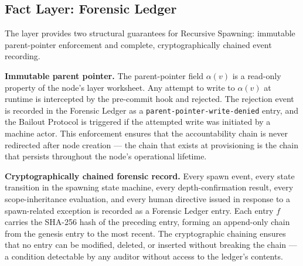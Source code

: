 \subsection{Fact Layer: Forensic Ledger}
\label{sec:rs-fact-fledger}

The \Fact{} layer provides two structural guarantees for Recursive Spawning:
immutable parent-pointer enforcement and complete, cryptographically chained
event recording.

\medskip
\noindent\textbf{Immutable parent pointer.}  The parent-pointer field
$\alpha(v)$ is a read-only property of the node's \Fact{} layer worksheet.
Any attempt to write to $\alpha(v)$ at runtime is intercepted by the pre-commit
hook and rejected.  The rejection event is recorded in the Forensic Ledger as
a \texttt{parent-pointer-write-denied} entry, and the Bailout Protocol is
triggered if the attempted write was initiated by a machine actor.  This
enforcement ensures that the accountability chain is never redirected after node
creation — the chain that exists at provisioning is the chain that persists
throughout the node's operational lifetime.

\medskip
\noindent\textbf{Cryptographically chained forensic record.}  Every spawn event,
every state transition in the spawning state machine, every depth-confirmation
result, every scope-inheritance evaluation, and every human directive issued in
response to a spawn-related exception is recorded as a Forensic Ledger entry.
Each entry $f$ carries the SHA-256 hash of the preceding entry, forming an
append-only chain from the genesis entry to the most recent.  The cryptographic
chaining ensures that no entry can be modified, deleted, or inserted without
breaking the chain — a condition detectable by any auditor without access to
the ledger's contents.

